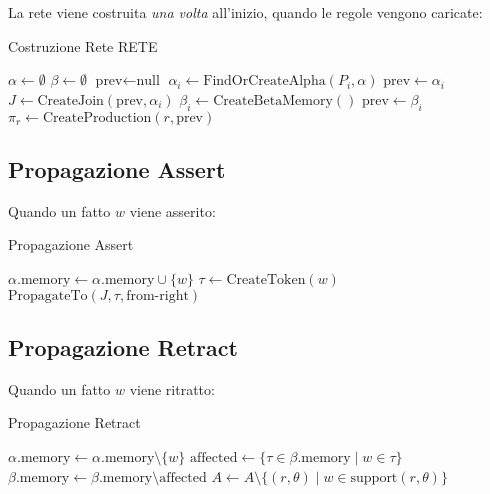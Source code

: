 La rete viene costruita \textit{una volta} all'inizio, quando le regole vengono caricate:

\begin{algorithm}[H]
\caption{Costruzione Rete RETE}
\begin{algorithmic}[1]
    \State $\alpha \gets \emptyset$ 
    \State $\beta \gets \emptyset$ 
        \State $\text{prev} \gets \text{null}$
            \State $\alpha_i \gets \text{FindOrCreateAlpha}(P_i, \alpha)$
                \State $\text{prev} \gets \alpha_i$ 
            \Else
                \State $J \gets \text{CreateJoin}(\text{prev}, \alpha_i)$
                \State $\beta_i \gets \text{CreateBetaMemory}()$
                \State $\text{prev} \gets \beta_i$
            \EndIf
        \EndFor
        \State $\pi_r \gets \text{CreateProduction}(r, \text{prev})$
    \EndFor
\EndFunction
\end{algorithmic}
\end{algorithm}

\subsection{Propagazione Assert}

Quando un fatto $w$ viene asserito:

\begin{algorithm}[H]
\caption{Propagazione Assert}
\begin{algorithmic}[1]
        \State $\alpha.\text{memory} \gets \alpha.\text{memory} \cup \{w\}$
        \State $\tau \gets \text{CreateToken}(w)$ 
            \State $\text{PropagateTo}(J, \tau, \text{from-right})$
        \EndFor
    \EndFor
\EndFunction
\end{algorithmic}
\end{algorithm}

\subsection{Propagazione Retract}

Quando un fatto $w$ viene ritratto:

\begin{algorithm}[H]
\caption{Propagazione Retract}
\begin{algorithmic}[1]
        \State $\alpha.\text{memory} \gets \alpha.\text{memory} \setminus \{w\}$
    \EndFor
        \State $\text{affected} \gets \{\tau \in \beta.\text{memory} \mid w \in \tau\}$
        \State $\beta.\text{memory} \gets \beta.\text{memory} \setminus \text{affected}$
    \EndFor
    \State $A \gets A \setminus \{(r, \theta) \mid w \in \text{support}(r, \theta)\}$
\EndFunction
\end{algorithmic}
\end{algorithm}

